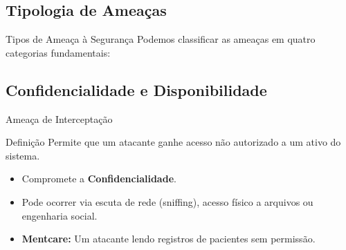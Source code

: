\documentclass[aspectratio=169]{beamer}
\begin{document}
\subsection{Tipologia de Ameaças}
\begin{frame}{Tipos de Ameaça à Segurança}
    Podemos classificar as ameaças em quatro categorias fundamentais:\\
    \centering
\end{frame}

\subsection{Confidencialidade e Disponibilidade}
\begin{frame}{Ameaça de Interceptação}
    \begin{block}{Definição}
        Permite que um atacante ganhe acesso não autorizado a um ativo do sistema.
    \end{block}
    \begin{itemize}
        \item Compromete a \textbf{Confidencialidade}.
        \item Pode ocorrer via escuta de rede (sniffing), acesso físico a arquivos ou engenharia social.
        \item \textbf{Mentcare:} Um atacante lendo registros de pacientes sem permissão.
    \end{itemize}
\end{frame}
\end{document}
